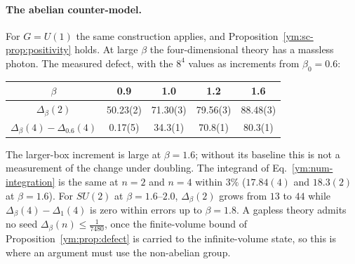 \paragraph{The abelian counter-model.} For $G=U(1)$ the same construction
applies, and Proposition~\ref{ym:sc-prop:positivity} holds. At large $\beta$
the four-dimensional theory has a massless photon. The measured defect,
with the $8^4$ values as increments from $\beta_0=0.6$:
\begin{center}
\begin{tabular}{ccccc}
$\beta$ & 0.9 & 1.0 & 1.2 & 1.6\\\hline
$\Delta_\beta(2)$ & 50.23(2) & 71.30(3) & 79.56(3) & 88.48(3)\\
$\Delta_\beta(4)-\Delta_{0.6}(4)$ & 0.17(5) & 34.3(1) & 70.8(1) & 80.3(1)
\end{tabular}
\end{center}
The larger-box increment is large at $\beta=1.6$; without its baseline
this is not a measurement of the change under doubling. The integrand of Eq.~\eqref{ym:num-integration} is the same at $n=2$ and
$n=4$ within $3\%$ ($17.84(4)$ and $18.3(2)$ at $\beta=1.6$). For $SU(2)$ at
$\beta=1.6$--$2.0$, $\Delta_\beta(2)$ grows from $13$ to $44$ while
$\Delta_\beta(4)-\Delta_1(4)$ is zero within errors up to $\beta=1.8$. A gapless theory admits no seed $\Delta_\beta(n)\le\frac1{7480}$,
once the finite-volume bound of Proposition~\ref{ym:prop:defect} is carried to
the infinite-volume state, so this is where an argument must use the
non-abelian group.


